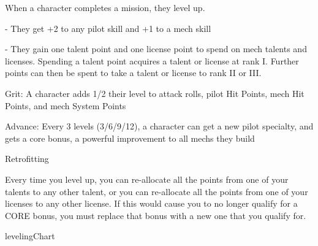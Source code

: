 When a character completes a mission, they level up.

             -   They get +2 to any pilot skill and +1 to a mech skill

             -   They gain one talent point and one license point to spend on mech talents and
                 licenses. Spending a talent point acquires a talent or license at rank I. Further
                 points can then be spent to take a talent or license to rank II or III.





Grit: A character adds 1/2 their level to attack rolls, pilot Hit Points, mech Hit Points, and mech
System Points

Advance: Every 3 levels (3/6/9/12), a character can get a new pilot specialty, and gets a core
bonus, a powerful improvement to all mechs they build


                                              Retrofitting

Every time you level up, you can re-allocate all the points from one of your talents to any other
talent, or you can re-allocate all the points from one of your licenses to any other license. If this
would cause you to no longer qualify for a CORE bonus, you must replace that bonus with a new
one that you qualify for.

{levelingChart}
